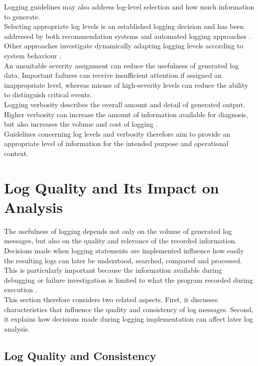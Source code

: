 Logging guidelines may also address log-level selection and how much information to generate.
\\
Selecting appropriate log levels is an established logging decision and has been 
addressed by both recommendation systems and automated logging approaches \cite{zhu2015learningtolog,mastropaolo2022usingdeeplearning}.
Other approaches investigate dynamically adapting logging levels according to system behaviour \cite{mizouchi2019padla}.
\\
An unsuitable severity assignment can reduce the usefulness of generated log data. 
Important failures can receive insufficient attention if assigned an inappropriate level, 
whereas misuse of high-severity levels can reduce the ability to distinguish critical events.
\\
Logging verbosity describes the overall amount and detail of generated output. 
Higher verbosity can increase the amount of information available for diagnosis, 
but also increases the volume and cost of logging \cite{gholamian2021whatdistributedsystemssay}.
\\
Guidelines concerning log levels and verbosity therefore aim to provide an appropriate 
level of information for the intended purpose and operational context.

\section{Log Quality and Its Impact on Analysis}
\label{sec:logging_quality}

The usefulness of logging depends not only on the volume of generated log messages, but also on the quality and relevance of the recorded information.
Decisions made when logging statements are implemented influence how easily the resulting logs can later be understood, searched, 
compared and processed. This is particularly important because the information available during debugging or failure investigation 
is limited to what the program recorded during execution \cite{chen2021asurveyofsoftwareloginstrumentation}.
\\
This section therefore considers two related aspects. First, it discusses characteristics that influence the quality 
and consistency of log messages. Second, it explains how decisions made during logging implementation can affect later log analysis.

\subsection{Log Quality and Consistency}
\label{subsec:log_quality}

